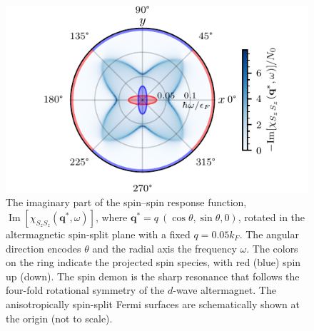 \documentclass[aps,prl,reprint,twocolumns,superscriptaddress]{revtex4-2}
\DeclareMathOperator{\Imm}{Im}
\newcommand{\kF}{k_{F}}
\newenvironment{DIFnomarkup}{}{} %
\providecommand{\DIFaddbegin}{} %
\begin{document}
	\DIFaddbegin \begin{DIFnomarkup}
	\begin{figure}
		\includegraphics[width=\columnwidth]{polar-plot-chiSzSz}
		\caption{The imaginary part of the spin–spin response function, $\Imm[\chi_{S_zS_z}(\bm q^*,\omega)]$, where $\bm q^*=q\ (\cos\theta,\sin\theta,0)$, rotated in the altermagnetic spin-split plane with a fixed $q=0.05\kF$. The angular direction encodes $\theta$ and the radial axis the frequency $\omega$. The colors on the ring indicate the projected spin species, with red (blue) spin up (down). The spin demon is the sharp resonance that follows the four-fold rotational symmetry of the $d$-wave altermagnet. The anisotropically spin-split Fermi surfaces are schematically shown at the origin (not to scale). \label{fig:polar}	}
	\end{figure}


\end{DIFnomarkup}
\end{document}
